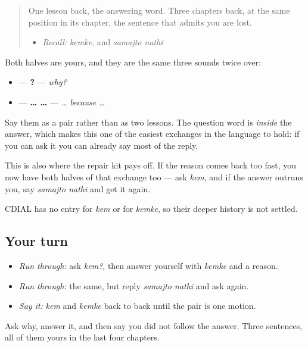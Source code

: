 \begin{quote}
One lesson back, the answering word. Three chapters back, at the same position in its chapter, the sentence that admits you are lost.

\begin{itemize}
\raggedright
  \item \emph{Recall:} \emph{kemke}, and \emph{samajto nathī}
\end{itemize}
\end{quote}

\begin{cousinweb}
Both halves are yours, and they are the same three sounds twice over:

\begin{itemize}
\raggedright
  \item — \textbf{?} — \emph{why?}
  \item — \textbf{…  …} — \emph{… because …}
\end{itemize}

Say them as a pair rather than as two lessons. The question word is \emph{inside} the answer, which makes this one of the easiest exchanges in the language to hold: if you can ask it you can already say most of the reply.

This is also where the repair kit pays off. If the reason comes back too fast, you now have both halves of that exchange too — ask \emph{kem}, and if the answer outruns you, say \emph{samajto nathī} and get it again.

CDIAL has no entry for \emph{kem} or for \emph{kemke}, so their deeper history is not settled.
\end{cousinweb}

\subsection*{Your turn}
\begin{itemize}
\raggedright
  \item \emph{Run through:} ask \emph{kem?}, then answer yourself with \emph{kemke} and a reason.
  \item \emph{Run through:} the same, but reply \emph{samajto nathī} and ask again.
  \item \emph{Say it:} \emph{kem} and \emph{kemke} back to back until the pair is one motion.
\end{itemize}

\begin{tcolorbox}[breakable,colback=teal!4,colframe=teal!35!black,title={Before you move on}]
Ask why, answer it, and then say you did not follow the answer. Three sentences, all of them yours in the last four chapters.
\end{tcolorbox}
